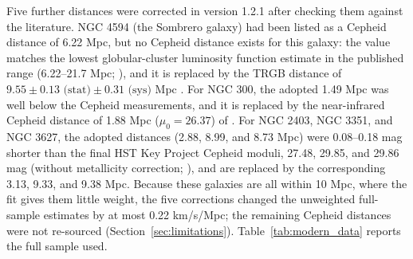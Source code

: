 \documentclass[11pt]{article}
\begin{document}
Five further distances were corrected in version 1.2.1 after checking them against the literature. NGC 4594 (the Sombrero galaxy) had been listed as a Cepheid distance of 6.22 Mpc, but no Cepheid distance exists for this galaxy: the value matches the lowest globular-cluster luminosity function estimate in the published range (6.22--21.7 Mpc; \citealt{mcquinn2016}), and it is replaced by the TRGB distance of $9.55 \pm 0.13\text{ (stat)} \pm 0.31\text{ (sys)}$ Mpc \citep{mcquinn2016}. For NGC 300, the adopted 1.49 Mpc was well below the Cepheid measurements, and it is replaced by the near-infrared Cepheid distance of 1.88 Mpc ($\mu_0 = 26.37$) of \citet{gieren2005}. For NGC 2403, NGC 3351, and NGC 3627, the adopted distances (2.88, 8.99, and 8.73 Mpc) were 0.08--0.18 mag shorter than the final HST Key Project Cepheid moduli, 27.48, 29.85, and 29.86 mag (without metallicity correction; \citealt{freedman2001}), and are replaced by the corresponding 3.13, 9.33, and 9.38 Mpc. Because these galaxies are all within 10 Mpc, where the fit gives them little weight, the five corrections changed the unweighted full-sample estimates by at most 0.22 km/s/Mpc; the remaining Cepheid distances were not re-sourced (Section~\ref{sec:limitations}). Table~\ref{tab:modern_data} reports the full sample used.
\end{document}
